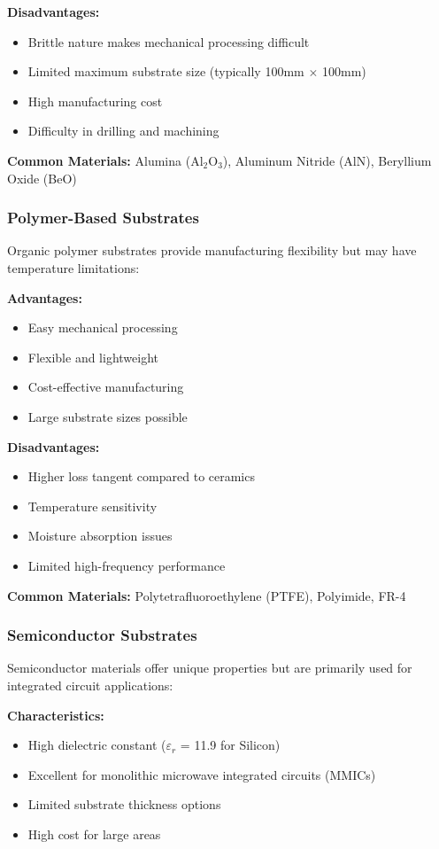 \documentclass[12pt]{article}
\begin{document}
\textbf{Disadvantages:}
\begin{itemize}
    \item Brittle nature makes mechanical processing difficult
    \item Limited maximum substrate size (typically 100mm $\times$ 100mm)
    \item High manufacturing cost
    \item Difficulty in drilling and machining
\end{itemize}

\textbf{Common Materials:} Alumina (Al$_2$O$_3$), Aluminum Nitride (AlN), Beryllium Oxide (BeO)

\subsubsection{Polymer-Based Substrates}

Organic polymer substrates provide manufacturing flexibility but may have temperature limitations:

\textbf{Advantages:}
\begin{itemize}
    \item Easy mechanical processing
    \item Flexible and lightweight
    \item Cost-effective manufacturing
    \item Large substrate sizes possible
\end{itemize}

\textbf{Disadvantages:}
\begin{itemize}
    \item Higher loss tangent compared to ceramics
    \item Temperature sensitivity
    \item Moisture absorption issues
    \item Limited high-frequency performance
\end{itemize}

\textbf{Common Materials:} Polytetrafluoroethylene (PTFE), Polyimide, FR-4

\subsubsection{Semiconductor Substrates}

Semiconductor materials offer unique properties but are primarily used for integrated circuit applications:

\textbf{Characteristics:}
\begin{itemize}
    \item High dielectric constant ($\varepsilon_r$ = 11.9 for Silicon)
    \item Excellent for monolithic microwave integrated circuits (MMICs)
    \item Limited substrate thickness options
    \item High cost for large areas
\end{itemize}
\end{document}
